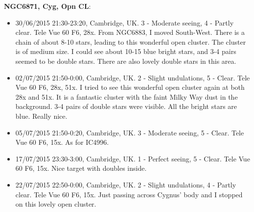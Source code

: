 {\bf NGC6871, Cyg, Opn CL}:
\begin{itemize}
\item 30/06/2015 21:30-23:20, Cambridge, UK. 3 - Moderate seeing, 4 - Partly clear. Tele Vue 60 F6, 28x. From NGC6883, I moved South-West. There is a chain of about 8-10 stars, leading to this wonderful open cluster. The cluster is of medium size. I could see about 10-15 blue bright stars, and 3-4 pairs seemed to be double stars. There are also lovely double stars in this area.
\item 02/07/2015 21:50-0:00, Cambridge, UK. 2 - Slight undulations, 5 - Clear. Tele Vue 60 F6, 28x, 51x. I tried to see this wonderful open cluster again at both 28x and 51x. It is a fantastic cluster with the faint Milky Way dust in the background. 3-4 pairs of double stars were visible. All the bright stars are blue. Really nice.
\item 05/07/2015 21:50-0:20, Cambridge, UK. 3 - Moderate seeing, 5 - Clear. Tele Vue 60 F6, 15x. As for IC4996.
\item 17/07/2015 23:30-3:00, Cambridge, UK. 1 - Perfect seeing, 5 - Clear. Tele Vue 60 F6, 15x. Nice target with doubles inside. 
\item 22/07/2015 22:50-0:00, Cambridge, UK. 2 - Slight undulations, 4 - Partly clear. Tele Vue 60 F6, 15x. Just passing across Cygnus' body and I stopped on this lovely open cluster. 
\end{itemize}
